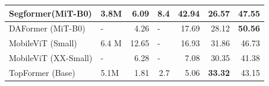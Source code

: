 \documentclass[a4paper,12pt]{report}
\begin{document}
\begin{table}[]
{\begin{tabular}{|l|l|r|l|r|r|r|}
            Segformer(MiT-B0)    & 3.8M                                                      & 6.09                                                                                & \multicolumn{1}{r|}{8.4}                                              & 42.94                                                                                      & 26.57                                                                              & 47.55                                                                      \\ \hline
            DAFormer (MiT-B0)    & -                                                         & 4.26                                                                                & -                                                                     & 17.69                                                                                      & 28.12                                                                              & \textbf{50.56}                                                             \\ \hline
            MobileViT (Small)    & 6.4 M                                                     & 12.65                                                                               & -                                                                     & 16.93                                                                                      & 31.86                                                                              & 46.73                                                                      \\ \hline
            MobileViT (XX-Small) & -                                                         & 6.28                                                                                & -                                                                     & 7.08                                                                                       & 30.35                                                                              & 41.38                                                                      \\ \hline
            TopFormer (Base)     & 5.1M                                                      & 1.81                                                                                & \multicolumn{1}{r|}{2.7}                                              & 5.06                                                                                       & \textbf{33.32}                                                                     & 43.15                                                                      \\ \hline

\end{tabular}}
\end{table}
\end{document}
